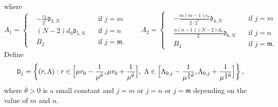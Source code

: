 \documentclass[11pt,a4paper]{amsart}
\begin{document}
where 
$$A_1=\left\{\begin{aligned}&-\frac{c_0}{2^*}\mathfrak d_{3, N}\quad &\mbox{if}\,\, j=m\\
&(N-2)d_0\mathfrak d_{5, N}\quad &\mbox{if}\,\, j=n\\
& B_2\quad &\mbox{if}\,\, j=\mathfrak m.\end{aligned}\right.\qquad A_2=\left\{\begin{aligned}&-\frac{m(m-1)c_0}{2\cdot 2^*}\mathfrak d_{4, N}\quad &\mbox{if}\,\, j=m\\
&\frac{n(n-1)(N-2)d_0}{2}\mathfrak d_{6, N}\quad &\mbox{if}\,\, j=n\\
& B_3\quad &\mbox{if}\,\, j=\mathfrak m.\end{aligned}\right.$$
Define
\begin{align*}
  \mathtt D_j=\left\{(r, \Lambda): r \in\Bigl[\mu r_{0}-\frac{1}{\mu^{\bar{\theta}}}, \mu r_{0}+\frac{1}{\mu^{\bar{\theta}}}\Bigr], ~ \Lambda \in\Bigl[\Lambda_{0, j}-\frac{1}{\mu^{\frac{3}{2} \bar{\theta}}}, \Lambda_{0, j}+\frac{1}{\mu^{\frac{3}{2} \bar{\theta}}}\Bigr]\right\},
\end{align*}
where $\bar{\theta}>0$ is a small constant and $j=m$ or $j=n$ or $j=\mathfrak m$ depending on the value of $m$ and $n$.\\
\end{document}
